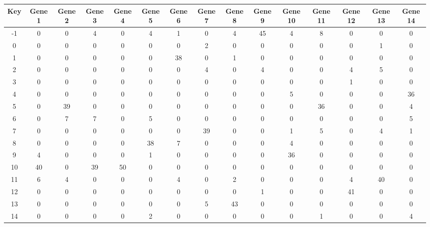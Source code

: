 \begin{tabular}{|c|c|c|c|c|c|c|c|c|c|c|c|c|c|c|}
\hline
Key & Gene 1 & Gene 2 & Gene 3 & Gene 4 & Gene 5 & Gene 6 & Gene 7 & Gene 8 & Gene 9 & Gene 10 & Gene 11 & Gene 12 & Gene 13 & Gene 14 \\
\hline
-1 & 0 & 0 & 4 & 0 & 4 & 1 & 0 & 4 & 45 & 4 & 8 & 0 & 0 & 0 \\
0 & 0 & 0 & 0 & 0 & 0 & 0 & 2 & 0 & 0 & 0 & 0 & 0 & 1 & 0 \\
1 & 0 & 0 & 0 & 0 & 0 & 38 & 0 & 1 & 0 & 0 & 0 & 0 & 0 & 0 \\
2 & 0 & 0 & 0 & 0 & 0 & 0 & 4 & 0 & 4 & 0 & 0 & 4 & 5 & 0 \\
3 & 0 & 0 & 0 & 0 & 0 & 0 & 0 & 0 & 0 & 0 & 0 & 1 & 0 & 0 \\
4 & 0 & 0 & 0 & 0 & 0 & 0 & 0 & 0 & 0 & 5 & 0 & 0 & 0 & 36 \\
5 & 0 & 39 & 0 & 0 & 0 & 0 & 0 & 0 & 0 & 0 & 36 & 0 & 0 & 4 \\
6 & 0 & 7 & 7 & 0 & 5 & 0 & 0 & 0 & 0 & 0 & 0 & 0 & 0 & 5 \\
7 & 0 & 0 & 0 & 0 & 0 & 0 & 39 & 0 & 0 & 1 & 5 & 0 & 4 & 1 \\
8 & 0 & 0 & 0 & 0 & 38 & 7 & 0 & 0 & 0 & 4 & 0 & 0 & 0 & 0 \\
9 & 4 & 0 & 0 & 0 & 1 & 0 & 0 & 0 & 0 & 36 & 0 & 0 & 0 & 0 \\
10 & 40 & 0 & 39 & 50 & 0 & 0 & 0 & 0 & 0 & 0 & 0 & 0 & 0 & 0 \\
11 & 6 & 4 & 0 & 0 & 0 & 4 & 0 & 2 & 0 & 0 & 0 & 4 & 40 & 0 \\
12 & 0 & 0 & 0 & 0 & 0 & 0 & 0 & 0 & 1 & 0 & 0 & 41 & 0 & 0 \\
13 & 0 & 0 & 0 & 0 & 0 & 0 & 5 & 43 & 0 & 0 & 0 & 0 & 0 & 0 \\
14 & 0 & 0 & 0 & 0 & 2 & 0 & 0 & 0 & 0 & 0 & 1 & 0 & 0 & 4 \\
\hline
\end{tabular}